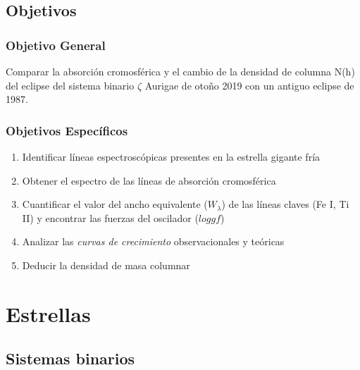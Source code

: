 \documentclass[12pt,oneside,openany,letter]{book}
\begin{document}
\section{Objetivos}

\subsection{Objetivo General}

Comparar la absorción cromosférica y el cambio de la densidad de columna N(h) del eclipse del sistema binario $\zeta$ Aurigae de otoño 2019 con un antiguo eclipse de 1987.


\subsection{Objetivos Espec\'ificos}
\begin{enumerate}
    \item Identificar líneas espectroscópicas presentes en la estrella gigante fría
    \item Obtener el espectro de las líneas de absorción cromosférica
    \item Cuantificar el valor del ancho equivalente ($W_{\lambda}$) de las líneas claves (Fe I, Ti II)  y encontrar las fuerzas del oscilador ($loggf$)

    \item Analizar las \textit{curvas de crecimiento} observacionales y teóricas

    \item Deducir la densidad de masa columnar
\end{enumerate}


\chapter{Estrellas}\label{cap2}

\section{Sistemas binarios}
\end{document}
